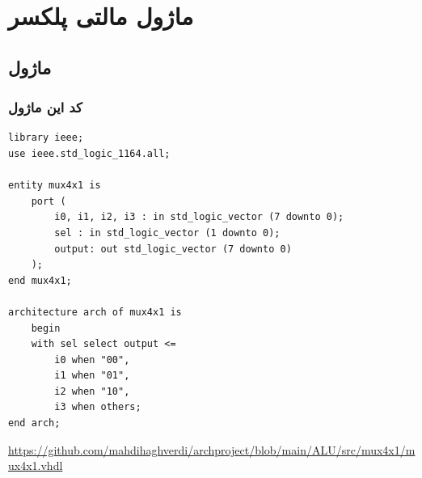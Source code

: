 \documentclass[dvipsnames, svgnames, x11names, a4paper, 11pt, oneside]{book}
\begin{document}
		\clearpage
		\chapter{ماژول مالتی پلکسر}
			\section{ماژول }
				\subsection{کد این ماژول}
					\begin{latin}
						\begin{lstlisting}
library ieee;
use ieee.std_logic_1164.all;

entity mux4x1 is
	port (
		i0, i1, i2, i3 : in std_logic_vector (7 downto 0);
		sel : in std_logic_vector (1 downto 0);
		output: out std_logic_vector (7 downto 0)
	);
end mux4x1;

architecture arch of mux4x1 is
	begin
	with sel select output <=
		i0 when "00",
		i1 when "01",
		i2 when "10",
		i3 when others;
end arch;
						\end{lstlisting}
						\url{https://github.com/mahdihaghverdi/archproject/blob/main/ALU/src/mux4x1/mux4x1.vhdl}
					\end{latin}
				
\end{document}
